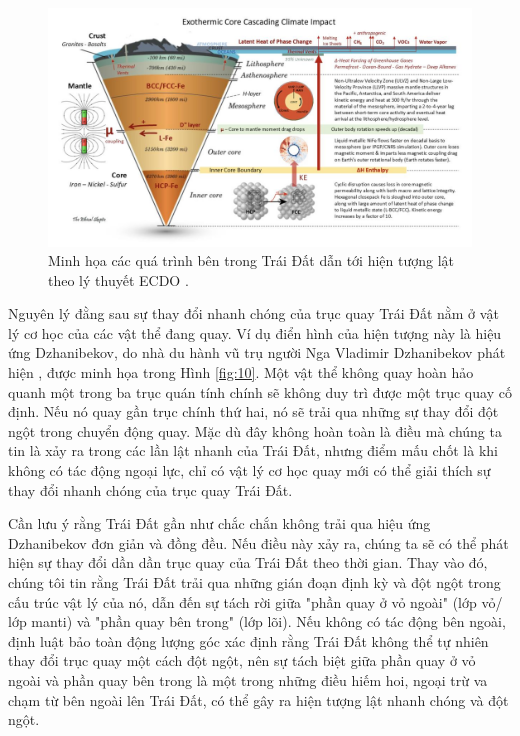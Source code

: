 \documentclass[10pt,twocolumn,letterpaper]{article}
\begin{document}
\begin{figure}[t]
\begin{center}
\includegraphics[width=1\textwidth]{layers.jpg}
\end{center}
   \caption{Minh họa các quá trình bên trong Trái Đất dẫn tới hiện tượng lật theo lý thuyết ECDO \cite{129}.}
\label{fig:11}
\end{figure}

Nguyên lý đằng sau sự thay đổi nhanh chóng của trục quay Trái Đất nằm ở vật lý cơ học của các vật thể đang quay. Ví dụ điển hình của hiện tượng này là hiệu ứng Dzhanibekov, do nhà du hành vũ trụ người Nga Vladimir Dzhanibekov phát hiện \cite{37}, được minh họa trong Hình \ref{fig:10}. Một vật thể không quay hoàn hảo quanh một trong ba trục quán tính chính sẽ không duy trì được một trục quay cố định. Nếu nó quay gần trục chính thứ hai, nó sẽ trải qua những sự thay đổi đột ngột trong chuyển động quay. Mặc dù đây không hoàn toàn là điều mà chúng ta tin là xảy ra trong các lần lật nhanh của Trái Đất, nhưng điểm mấu chốt là khi không có tác động ngoại lực, chỉ có vật lý cơ học quay mới có thể giải thích sự thay đổi nhanh chóng của trục quay Trái Đất.

Cần lưu ý rằng Trái Đất gần như chắc chắn không trải qua hiệu ứng Dzhanibekov đơn giản và đồng đều. Nếu điều này xảy ra, chúng ta sẽ có thể phát hiện sự thay đổi dần dần trục quay của Trái Đất theo thời gian. Thay vào đó, chúng tôi tin rằng Trái Đất trải qua những gián đoạn định kỳ và đột ngột trong cấu trúc vật lý của nó, dẫn đến sự tách rời giữa "phần quay ở vỏ ngoài" (lớp vỏ/ lớp manti) và "phần quay bên trong" (lớp lõi). Nếu không có tác động bên ngoài, định luật bảo toàn động lượng góc xác định rằng Trái Đất không thể tự nhiên thay đổi trục quay một cách đột ngột, nên sự tách biệt giữa phần quay ở vỏ ngoài và phần quay bên trong là một trong những điều hiếm hoi, ngoại trừ va chạm từ bên ngoài lên Trái Đất, có thể gây ra hiện tượng lật nhanh chóng và đột ngột.
\end{document}
